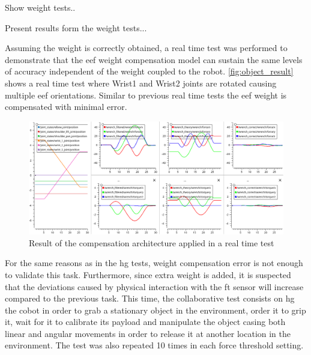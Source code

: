 
\par Show weight tests..

\par Present results form the weight tests... 

\par Assuming the weight is correctly obtained, a real time test was performed to demonstrate that the \ac{eef} weight compensation model can sustain the same levels of accuracy independent of the weight coupled to the robot. \autoref{fig:object_result} shows a real time test where Wrist1 and Wrist2 joints are rotated causing multiple \ac{eef} orientations. Similar to previous real time tests the \ac{eef} weight is compensated with minimal error.

\begin{figure}[h]
    \centering
    \includegraphics[width=0.9\linewidth]{figs/chp6/object_result.png}
    \caption{Result of the compensation architecture applied in a real time test}
    \label{fig:object_result}
\end{figure}

\par For the same reasons as in the \ac{hg} tests, weight compensation error is not enough to validate this task. Furthermore, since extra weight is added, it is suspected that the deviations caused by physical interaction with the \ac{ft} sensor will increase compared to the previous task. This time, the collaborative test consists on \ac{hg} the cobot in order to grab a stationary object in the environment, order it to grip it, wait for it to calibrate its payload and manipulate the object casing both linear and angular movements in order to release it at another location in the environment. The test was also repeated 10 times in each force threshold setting.

